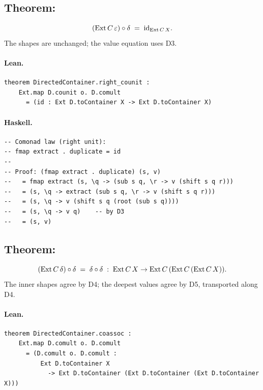 \documentclass[11pt,a4paper]{article}
\begin{document}
\subsection{Theorem: }

\begin{thm}
\[
  (\mathrm{Ext}\,C\,\varepsilon) \circ \delta \;=\; \mathrm{id}_{\mathrm{Ext}\,C\,X}.
\]
The shapes are unchanged; the value equation uses D3.
\end{thm}

\paragraph{Lean.}
\begin{lstlisting}[style=lean]
theorem DirectedContainer.right_counit :
    Ext.map D.counit o. D.comult
      = (id : Ext D.toContainer X -> Ext D.toContainer X)
\end{lstlisting}

\paragraph{Haskell.}
\begin{lstlisting}[style=haskell]
-- Comonad law (right unit):
-- fmap extract . duplicate = id
--
-- Proof: (fmap extract . duplicate) (s, v)
--   = fmap extract (s, \q -> (sub s q, \r -> v (shift s q r)))
--   = (s, \q -> extract (sub s q, \r -> v (shift s q r)))
--   = (s, \q -> v (shift s q (root (sub s q))))
--   = (s, \q -> v q)    -- by D3
--   = (s, v)
\end{lstlisting}


\subsection{Theorem: }

\begin{thm}[Coassociativity]
\[
  (\mathrm{Ext}\,C\,\delta) \circ \delta
  \;=\;
  \delta \circ \delta
  \;:\;
  \mathrm{Ext}\,C\,X \to \mathrm{Ext}\,C\,(\mathrm{Ext}\,C\,(\mathrm{Ext}\,C\,X)).
\]
The inner shapes agree by D4; the deepest values agree by D5, transported along
D4.
\end{thm}

\paragraph{Lean.}
\begin{lstlisting}[style=lean]
theorem DirectedContainer.coassoc :
    Ext.map D.comult o. D.comult
      = (D.comult o. D.comult :
          Ext D.toContainer X
            -> Ext D.toContainer (Ext D.toContainer (Ext D.toContainer X)))
\end{lstlisting}
\end{document}
